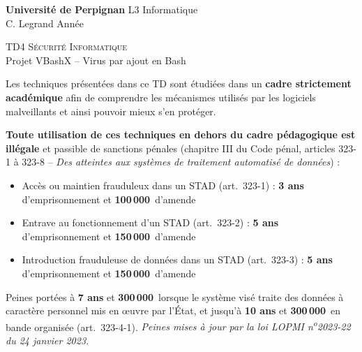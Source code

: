 \documentclass[a4paper,11pt]{article}
\theoremstyle{plain}
\theoremstyle{definition}
\begin{document}
\hbox{}
\noindent \textbf{Université de Perpignan} \hfill  L3 Informatique \\
 \hfill C. Legrand \hfill  Année \the\year  \\
\smallskip
\begin{center}
{
 {\scshape \large TD4 Sécurité Informatique}  \\
 Projet VBashX -- Virus par ajout en Bash
}
\end{center}
\hbox{}

\bigskip

\begin{ethique}
Les techniques présentées dans ce TD sont étudiées dans un \textbf{cadre strictement académique} afin de comprendre les mécanismes utilisés par les logiciels malveillants et ainsi pouvoir mieux s'en protéger.

\textbf{Toute utilisation de ces techniques en dehors du cadre pédagogique est illégale} et passible de sanctions pénales (chapitre III du Code pénal, articles 323-1 à 323-8 -- \textit{Des atteintes aux systèmes de traitement automatisé de données}) :
\begin{itemize}
    \item Accès ou maintien frauduleux dans un STAD (art.~323-1) : \textbf{3 ans} d'emprisonnement et \textbf{100\,000\,\texteuro{}} d'amende
    \item Entrave au fonctionnement d'un STAD (art.~323-2) : \textbf{5 ans} d'emprisonnement et \textbf{150\,000\,\texteuro{}} d'amende
    \item Introduction frauduleuse de données dans un STAD (art.~323-3) : \textbf{5 ans} d'emprisonnement et \textbf{150\,000\,\texteuro{}} d'amende
\end{itemize}
Peines portées à \textbf{7 ans} et \textbf{300\,000\,\texteuro{}} lorsque le système visé traite des données à caractère personnel mis en \oe uvre par l'État, et jusqu'à \textbf{10 ans} et \textbf{300\,000\,\texteuro{}} en bande organisée (art.~323-4-1). \textit{Peines mises à jour par la loi LOPMI n\textsuperscript{o}2023-22 du 24 janvier 2023.}
\end{ethique}

\bigskip

\end{document}
